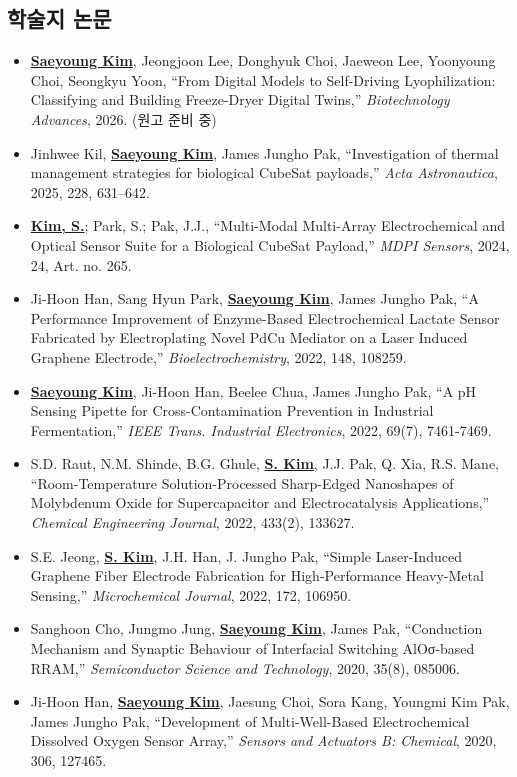 \documentclass[letterpaper,11pt]{article}
\newcommand{\resumeItem}[1]{
  \item\small{#1 \vspace{-1pt}}
}
\newcommand{\resumeSubHeadingListStart}{\begin{itemize}[leftmargin=*]}
\newcommand{\resumeSubHeadingListEnd}{\end{itemize}}
\begin{document}
\subsection*{\normalsize 학술지 논문}
  \resumeSubHeadingListStart
    \resumeItem{\textbf{\underline{Saeyoung Kim}}, Jeongjoon Lee, Donghyuk Choi, Jaeweon Lee, Yoonyoung Choi, Seongkyu Yoon, ``From Digital Models to Self-Driving Lyophilization: Classifying and Building Freeze-Dryer Digital Twins,'' \textit{Biotechnology Advances}, 2026. (원고 준비 중)}
    \resumeItem{Jinhwee Kil, \textbf{\underline{Saeyoung Kim}}, James Jungho Pak, ``Investigation of thermal management strategies for biological CubeSat payloads,'' \textit{Acta Astronautica}, 2025, 228, 631--642.}
    \resumeItem{\textbf{\underline{Kim, S.}}; Park, S.; Pak, J.J., ``Multi-Modal Multi-Array Electrochemical and Optical Sensor Suite for a Biological CubeSat Payload,'' \textit{MDPI Sensors}, 2024, 24, Art. no. 265.}
    \resumeItem{Ji-Hoon Han, Sang Hyun Park, \textbf{\underline{Saeyoung Kim}}, James Jungho Pak, ``A Performance Improvement of Enzyme-Based Electrochemical Lactate Sensor Fabricated by Electroplating Novel PdCu Mediator on a Laser Induced Graphene Electrode,'' \textit{Bioelectrochemistry}, 2022, 148, 108259.}
    \resumeItem{\textbf{\underline{Saeyoung Kim}}, Ji-Hoon Han, Beelee Chua, James Jungho Pak, ``A pH Sensing Pipette for Cross-Contamination Prevention in Industrial Fermentation,'' \textit{IEEE Trans. Industrial Electronics}, 2022, 69(7), 7461-7469.}
    \resumeItem{S.D. Raut, N.M. Shinde, B.G. Ghule, \textbf{\underline{S. Kim}}, J.J. Pak, Q. Xia, R.S. Mane, ``Room-Temperature Solution-Processed Sharp-Edged Nanoshapes of Molybdenum Oxide for Supercapacitor and Electrocatalysis Applications,'' \textit{Chemical Engineering Journal}, 2022, 433(2), 133627.}
    \resumeItem{S.E. Jeong, \textbf{\underline{S. Kim}}, J.H. Han, J. Jungho Pak, ``Simple Laser-Induced Graphene Fiber Electrode Fabrication for High-Performance Heavy-Metal Sensing,'' \textit{Microchemical Journal}, 2022, 172, 106950.}
    \resumeItem{Sanghoon Cho, Jungmo Jung, \textbf{\underline{Saeyoung Kim}}, James Pak, ``Conduction Mechanism and Synaptic Behaviour of Interfacial Switching AlOσ-based RRAM,'' \textit{Semiconductor Science and Technology}, 2020, 35(8), 085006.}
    \resumeItem{Ji-Hoon Han, \textbf{\underline{Saeyoung Kim}}, Jaesung Choi, Sora Kang, Youngmi Kim Pak, James Jungho Pak, ``Development of Multi-Well-Based Electrochemical Dissolved Oxygen Sensor Array,'' \textit{Sensors and Actuators B: Chemical}, 2020, 306, 127465.}
  \resumeSubHeadingListEnd
\end{document}
